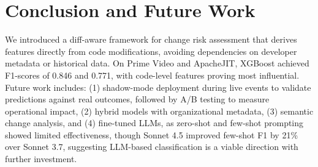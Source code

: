 \section{Conclusion and Future Work}

We introduced a diff-aware framework for change risk assessment that derives features directly from code modifications, avoiding dependencies on developer metadata or historical data. On Prime Video and ApacheJIT, XGBoost achieved F1-scores of 0.846 and 0.771, with code-level features proving most influential. Future work includes: (1) shadow-mode deployment during live events to validate predictions against real outcomes, followed by A/B testing to measure operational impact, (2) hybrid models with organizational metadata, (3) semantic change analysis, and (4) fine-tuned LLMs, as zero-shot and few-shot prompting showed limited effectiveness, though Sonnet 4.5 improved few-shot F1 by 21\% over Sonnet 3.7, suggesting LLM-based classification is a viable direction with further investment.
